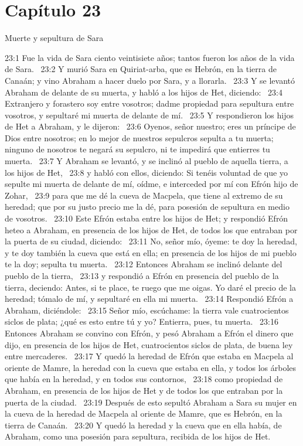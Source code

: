\section*{Capítulo 23}
Muerte y sepultura de Sara  

23:1 Fue la vida de Sara ciento veintisiete años; tantos fueron los años de la vida de Sara.  
23:2 Y murió Sara en Quiriat-arba, que es Hebrón, en la tierra de Canaán; y vino Abraham a hacer duelo por Sara, y a llorarla.  
23:3 Y se levantó Abraham de delante de su muerta, y habló a los hijos de Het, diciendo:  
23:4 Extranjero y forastero soy entre vosotros; dadme propiedad para sepultura entre vosotros, y sepultaré mi muerta de delante de mí.  
23:5 Y respondieron los hijos de Het a Abraham, y le dijeron:  
23:6 Oyenos, señor nuestro; eres un príncipe de Dios entre nosotros; en lo mejor de nuestros sepulcros sepulta a tu muerta; ninguno de nosotros te negará su sepulcro, ni te impedirá que entierres tu muerta.  
23:7 Y Abraham se levantó, y se inclinó al pueblo de aquella tierra, a los hijos de Het,  
23:8 y habló con ellos, diciendo: Si tenéis voluntad de que yo sepulte mi muerta de delante de mí, oídme, e interceded por mí con Efrón hijo de Zohar,  
23:9 para que me dé la cueva de Macpela, que tiene al extremo de su heredad; que por su justo precio me la dé, para posesión de sepultura en medio de vosotros.  
23:10 Este Efrón estaba entre los hijos de Het; y respondió Efrón heteo a Abraham, en presencia de los hijos de Het, de todos los que entraban por la puerta de su ciudad, diciendo:  
23:11 No, señor mío, óyeme: te doy la heredad, y te doy también la cueva que está en ella; en presencia de los hijos de mi pueblo te la doy; sepulta tu muerta.  
23:12 Entonces Abraham se inclinó delante del pueblo de la tierra,  
23:13 y respondió a Efrón en presencia del pueblo de la tierra, deciendo: Antes, si te place, te ruego que me oigas. Yo daré el precio de la heredad; tómalo de mí, y sepultaré en ella mi muerta.  
23:14 Respondió Efrón a Abraham, diciéndole:  
23:15 Señor mío, escúchame: la tierra vale cuatrocientos siclos de plata; ¿qué es esto entre tú y yo? Entierra, pues, tu muerta.  
23:16 Entonces Abraham se convino con Efrón, y pesó Abraham a Efrón el dinero que dijo, en presencia de los hijos de Het, cuatrocientos siclos de plata, de buena ley entre mercaderes.  
23:17 Y quedó la heredad de Efrón que estaba en Macpela al oriente de Mamre, la heredad con la cueva que estaba en ella, y todos los árboles que había en la heredad, y en todos sus contornos,  
23:18 como propiedad de Abraham, en presencia de los hijos de Het y de todos los que entraban por la puerta de la ciudad.  
23:19 Después de esto sepultó Abraham a Sara su mujer en la cueva de la heredad de Macpela al oriente de Mamre, que es Hebrón, en la tierra de Canaán.  
23:20 Y quedó la heredad y la cueva que en ella había, de Abraham, como una posesión para sepultura, recibida de los hijos de Het.  
